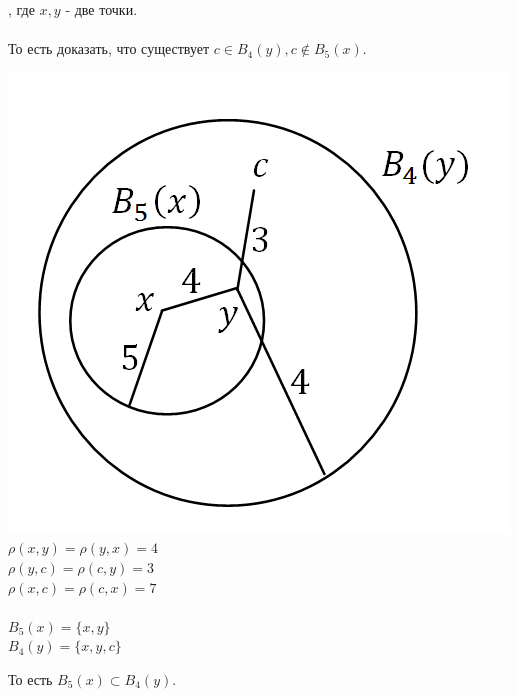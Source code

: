 \documentclass[12pt]{article}
\begin{document}
	, где $x, y$ - две точки. \\ \\То есть доказать, что существует $c\in B_4(y), c\notin B_5(x)$.\begin{center}
		\includegraphics[scale=0.5]{l4_5.png}\\
		$\rho (x, y) = \rho(y, x) = 4$\\
		$\rho (y, c) = \rho(c, y) = 3$\\
		$\rho (x, c) = \rho(c, x) = 7$\\
		~\\
		$B_5(x) = \{ x, y \}$\\
		$B_4(y) = \{x, y, c \} $\end{center}
	То есть $B_5(x) \subset B_4(y)$.\\
	
\end{document}
